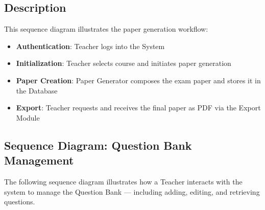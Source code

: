 \documentclass[12pt]{article}
\begin{document}
\subsection*{Description}

This sequence diagram illustrates the paper generation workflow:
\begin{itemize}
	\item \textbf{Authentication}: Teacher logs into the System
	\item \textbf{Initialization}: Teacher selects course and initiates paper generation
	\item \textbf{Paper Creation}: Paper Generator composes the exam paper and stores it in the Database
	\item \textbf{Export}: Teacher requests and receives the final paper as PDF via the Export Module
\end{itemize}

\newpage

\subsection{Sequence Diagram: Question Bank Management}

The following sequence diagram illustrates how a Teacher interacts with the system to manage the Question Bank — including adding, editing, and retrieving questions.
\end{document}
